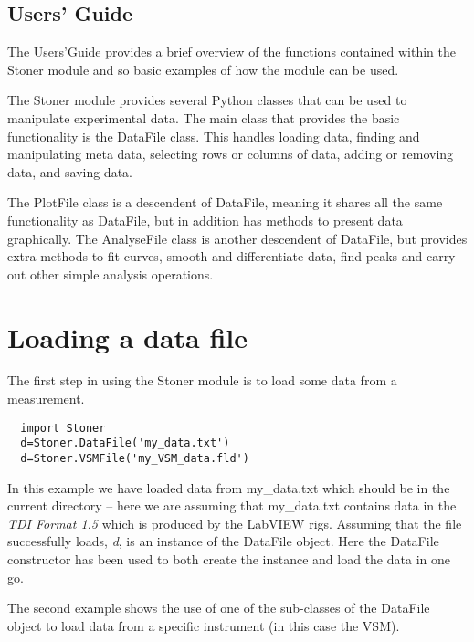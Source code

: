 \documentclass[a4paper,11pt]{scrartcl}
\begin{document}

\subsection{Users' Guide}

The Users'Guide provides a brief overview of the functions contained within the
Stoner module and so basic examples of how the module can be used.

The Stoner module provides several Python classes that can be used to manipulate
experimental data. The main class that provides the basic functionality is the
DataFile class. This handles loading data, finding and manipulating meta data,
selecting rows or columns of data, adding or removing data, and saving data.

The PlotFile class is a descendent of DataFile, meaning it shares all the same
functionality as DataFile, but in addition has methods to present data
graphically. The AnalyseFile class is another descendent of DataFile, but
provides extra methods to fit curves, smooth and differentiate data, find peaks
and carry out other simple analysis operations.

\section{Loading a data file}

The first step in using the Stoner module is to load some data from a
measurement.

\begin{lstlisting}
  import Stoner
  d=Stoner.DataFile('my_data.txt')
  d=Stoner.VSMFile('my_VSM_data.fld')
\end{lstlisting}

In this example we have loaded data from my\_data.txt which should be in the
current directory -- here we are assuming that my\_data.txt contains data in the
\textit{TDI Format 1.5} which is produced by the LabVIEW rigs. Assuming that the
file successfully loads, \textit{d}, is an instance of the DataFile object. Here
the DataFile constructor has been used to both create the instance and load the
data in one go.

The second example shows the use of one of the sub-classes of the DataFile object to load data from a specific instrument (in this case the VSM).
\end{document}
